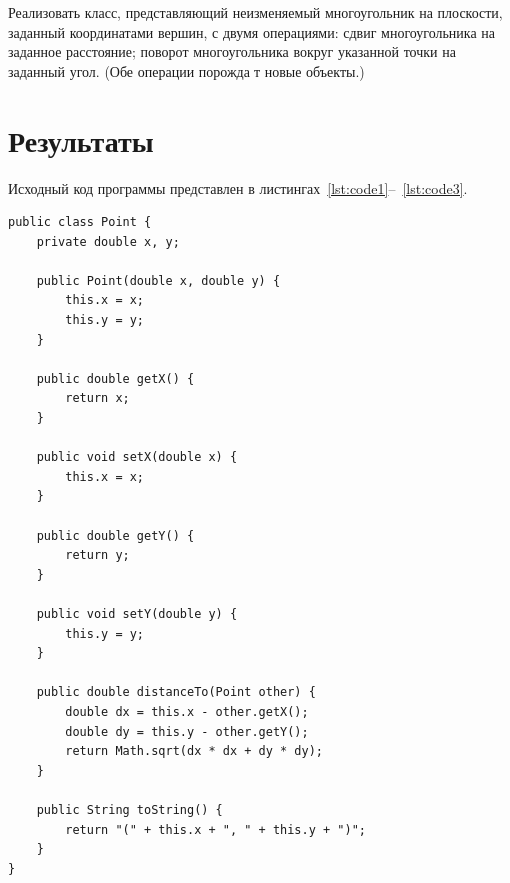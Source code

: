 \documentclass[a4paper, 14pt]{extarticle}
\begin{document}
Реализовать класс, представляющий неизменяемый многоугольник на плоскости, 
заданный координатами вершин, с двумя операциями: сдвиг многоугольника на заданное расстояние; 
поворот многоугольника вокруг указанной точки на заданный угол.
(Обе операции порожда􏰀т новые объекты.)


\section{Результаты}\label{Sect::res}

Исходный код программы представлен в листингах~\ref{lst:code1}--~\ref{lst:code3}.

\begin{lstlisting}[language={},caption={класс Point},label={lst:code1}]
public class Point {
    private double x, y;

    public Point(double x, double y) {
        this.x = x;
        this.y = y;
    }

    public double getX() {
        return x;
    }

    public void setX(double x) {
        this.x = x;
    }

    public double getY() {
        return y;
    }

    public void setY(double y) {
        this.y = y;
    }

    public double distanceTo(Point other) {
        double dx = this.x - other.getX();
        double dy = this.y - other.getY();
        return Math.sqrt(dx * dx + dy * dy);
    }

    public String toString() {
        return "(" + this.x + ", " + this.y + ")";
    }
}    
\end{lstlisting}
\end{document}
